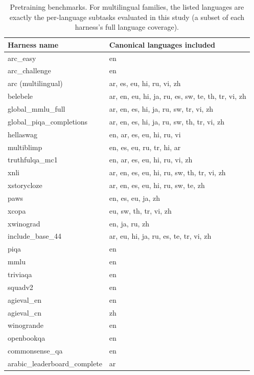 \begin{table}[t]
\centering
\caption{Pretraining benchmarks. For multilingual families, the listed languages are exactly the per-language subtasks evaluated in this study (a subset of each harness's full language coverage).}
\label{tab:pretraining-benchmarks}
\begin{tabular}{ll}
\toprule
\textbf{Harness name} & \textbf{Canonical languages included} \\
\midrule
arc\_easy                  & en \\
arc\_challenge             & en \\
arc (multilingual)         & ar, es, eu, hi, ru, vi, zh \\
belebele                   & ar, en, eu, hi, ja, ru, es, sw, te, th, tr, vi, zh \\
global\_mmlu\_full         & ar, en, es, hi, ja, ru, sw, tr, vi, zh \\
global\_piqa\_completions  & ar, en, es, hi, ja, ru, sw, th, tr, vi, zh \\
hellaswag                  & en, ar, es, eu, hi, ru, vi \\
multiblimp                 & en, es, eu, ru, tr, hi, ar \\
truthfulqa\_mc1            & en, ar, es, eu, hi, ru, vi, zh \\
xnli                       & ar, en, es, eu, hi, ru, sw, th, tr, vi, zh \\
xstorycloze                & ar, en, es, eu, hi, ru, sw, te, zh \\
paws                       & en, es, eu, ja, zh \\
xcopa                      & eu, sw, th, tr, vi, zh \\
xwinograd                  & en, ja, ru, zh \\
include\_base\_44          & ar, eu, hi, ja, ru, es, te, tr, vi, zh \\
piqa                       & en \\
mmlu                       & en \\
triviaqa                   & en \\
squadv2                    & en \\
agieval\_en                & en \\
agieval\_cn                & zh \\
winogrande                 & en \\
openbookqa                 & en \\
commonsense\_qa            & en \\
arabic\_leaderboard\_complete & ar \\
\bottomrule
\end{tabular}
\end{table}
